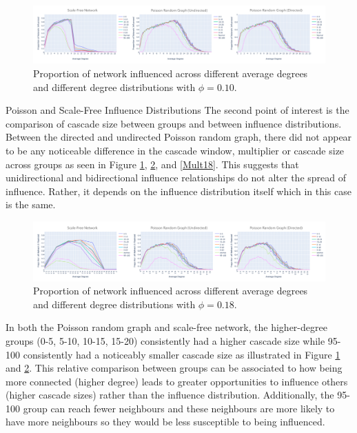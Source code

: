 \documentclass[10pt, oneside, reqno]{amsart}
\makeatletter
\theoremstyle{plain}%
\theoremstyle{definition}
\theoremstyle{remark}
\renewcommand\subsection{\@startsection{subsection}{2}%
  \z@{.5\linespacing\@plus.7\linespacing}{-.5em}%
  {\normalfont\scshape}}
\makeatother
\begin{document}
\begin{figure}[ht]
    \includegraphics[scale=0.2]{Report/figs/SFRGRG10.png}
    \caption{Proportion of network influenced across different average degrees and different degree distributions with $\phi = 0.10$.}
    \label{Phi10}
\end{figure}

\subsection{Poisson and Scale-Free Influence Distributions}
The second point of interest is the comparison of cascade size between groups and between influence distributions. 
Between the directed and undirected Poisson random graph, there did not appear to be any noticeable difference in the cascade window, multiplier or cascade size across groups as seen in Figure \ref{Phi10}, \ref{Phi18}, and \ref{Mult18}.
This suggests that unidirectional and bidirectional influence relationships do not alter the spread of influence. 
Rather, it depends on the influence distribution itself which in this case is the same.



\begin{figure}[ht]
    \includegraphics[scale=0.2]{Report/figs/SFRGRG18.png}
    \caption{Proportion of network influenced across different average degrees and different degree distributions with $\phi = 0.18$.}
    \label{Phi18}
\end{figure}


In both the Poisson random graph and scale-free network, the higher-degree groups (0-5, 5-10, 10-15, 15-20) consistently had a higher cascade size while 95-100 consistently had a noticeably smaller cascade size as illustrated in Figure \ref{Phi10} and \ref{Phi18}.
This relative comparison between groups can be associated to how being more connected (higher degree) leads to greater opportunities to influence others (higher cascade sizes) rather than the influence distribution.
Additionally, the 95-100 group can reach fewer neighbours and these neighbours are more likely to have more neighbours so they would be less susceptible to being influenced.
\end{document}
